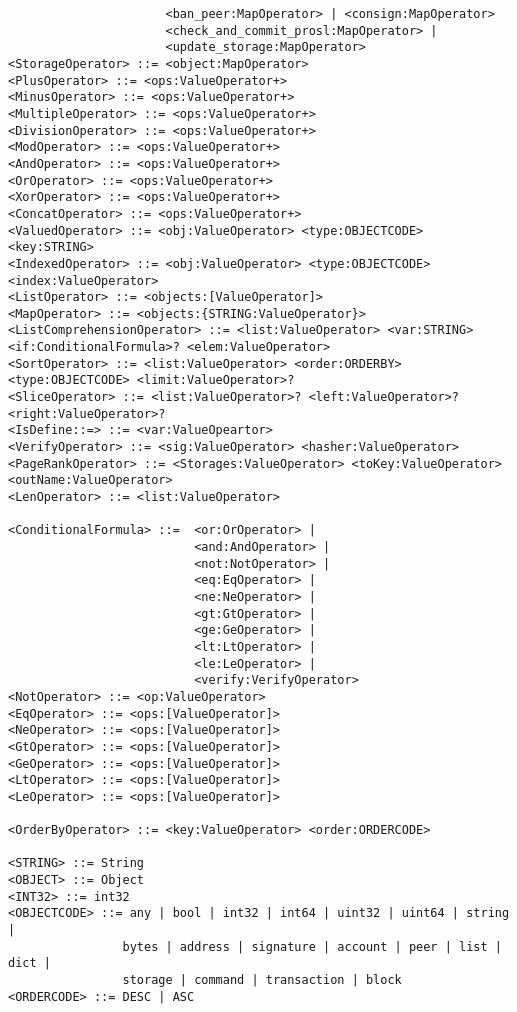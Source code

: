 \begin{verbatim}
                      <ban_peer:MapOperator> | <consign:MapOperator>
                      <check_and_commit_prosl:MapOperator> |
                      <update_storage:MapOperator>
<StorageOperator> ::= <object:MapOperator>
<PlusOperator> ::= <ops:ValueOperator+>
<MinusOperator> ::= <ops:ValueOperator+>
<MultipleOperator> ::= <ops:ValueOperator+>
<DivisionOperator> ::= <ops:ValueOperator+>
<ModOperator> ::= <ops:ValueOperator+>
<AndOperator> ::= <ops:ValueOperator+>
<OrOperator> ::= <ops:ValueOperator+>
<XorOperator> ::= <ops:ValueOperator+>
<ConcatOperator> ::= <ops:ValueOperator+>
<ValuedOperator> ::= <obj:ValueOperator> <type:OBJECTCODE> <key:STRING>
<IndexedOperator> ::= <obj:ValueOperator> <type:OBJECTCODE> <index:ValueOperator>
<ListOperator> ::= <objects:[ValueOperator]>
<MapOperator> ::= <objects:{STRING:ValueOperator}>
<ListComprehensionOperator> ::= <list:ValueOperator> <var:STRING> <if:ConditionalFormula>? <elem:ValueOperator>
<SortOperator> ::= <list:ValueOperator> <order:ORDERBY> <type:OBJECTCODE> <limit:ValueOperator>?
<SliceOperator> ::= <list:ValueOperator>? <left:ValueOperator>? <right:ValueOperator>?
<IsDefine::=> ::= <var:ValueOpeartor>
<VerifyOperator> ::= <sig:ValueOperator> <hasher:ValueOperator>
<PageRankOperator> ::= <Storages:ValueOperator> <toKey:ValueOperator> <outName:ValueOperator>
<LenOperator> ::= <list:ValueOperator>

<ConditionalFormula> ::=  <or:OrOperator> |
                          <and:AndOperator> |
                          <not:NotOperator> |
                          <eq:EqOperator> |
                          <ne:NeOperator> |
                          <gt:GtOperator> |
                          <ge:GeOperator> |
                          <lt:LtOperator> |
                          <le:LeOperator> |
                          <verify:VerifyOperator>
<NotOperator> ::= <op:ValueOperator>
<EqOperator> ::= <ops:[ValueOperator]>
<NeOperator> ::= <ops:[ValueOperator]>
<GtOperator> ::= <ops:[ValueOperator]>
<GeOperator> ::= <ops:[ValueOperator]>
<LtOperator> ::= <ops:[ValueOperator]>
<LeOperator> ::= <ops:[ValueOperator]>

<OrderByOperator> ::= <key:ValueOperator> <order:ORDERCODE>

<STRING> ::= String
<OBJECT> ::= Object
<INT32> ::= int32
<OBJECTCODE> ::= any | bool | int32 | int64 | uint32 | uint64 | string |
                bytes | address | signature | account | peer | list | dict |
                storage | command | transaction | block
<ORDERCODE> ::= DESC | ASC
\end{verbatim}

